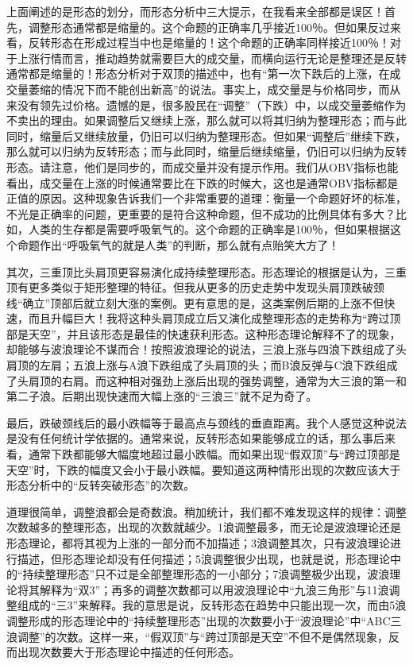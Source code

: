 上面阐述的是形态的划分，而形态分析中三大提示，在我看来全部都是误区！首先，调整形态通常都是缩量的。这个命题的正确率几乎接近100％。但如果反过来看，反转形态在形成过程当中也是缩量的！这个命题的正确率同样接近100％！对于上涨行情而言，推动趋势就需要巨大的成交量，而横向运行无论是整理还是反转通常都是缩量的！形态分析对于双顶的描述中，也有“第一次下跌后的上涨，在成交量萎缩的情况下而不能创出新高”的说法。事实上，成交量是与价格同步，而从来没有领先过价格。遗憾的是，很多股民在“调整”（下跌）中，以成交量萎缩作为不卖出的理由。如果调整后又继续上涨，那么就可以将其归纳为整理形态；而与此同时，缩量后又继续放量，仍旧可以归纳为整理形态。但如果“调整后”继续下跌，那么就可以归纳为反转形态；而与此同时，缩量后继续缩量，仍旧可以归纳为反转形态。请注意，他们是同步的，而成交量并没有提示作用。我们从OBV指标也能看出，成交量在上涨的时候通常要比在下跌的时候大，这也是通常OBV指标都是正值的原因。这种现象告诉我们一个非常重要的道理：衡量一个命题好坏的标准，不光是正确率的问题，更重要的是符合这种命题，但不成功的比例具体有多大？比如，人类的生存都是需要呼吸氧气的。这个命题的正确率是100％，但如果根据这个命题作出“呼吸氧气的就是人类”的判断，那么就有点贻笑大方了！

其次，三重顶比头肩顶更容易演化成持续整理形态。形态理论的根据是认为，三重顶有更多类似于矩形整理的特征。但我从更多的历史走势中发现头肩顶跌破颈线“确立”顶部后就立刻大涨的案例。更有意思的是，这类案例后期的上涨不但快速，而且升幅巨大！我将这种头肩顶成立后又演化成整理形态的走势称为“跨过顶部是天空”，并且该形态是最佳的快速获利形态。这种形态理论解释不了的现象，却能够与波浪理论不谋而合！按照波浪理论的说法，三浪上涨与四浪下跌组成了头肩顶的左肩；五浪上涨与A浪下跌组成了头肩顶的头；而B浪反弹与C浪下跌组成了头肩顶的右肩。而这种相对强劲上涨后出现的强势调整，通常为大三浪的第一和第二子浪。后期出现快速而大幅上涨的“三浪三”就不足为奇了。

最后，跌破颈线后的最小跌幅等于最高点与颈线的垂直距离。我个人感觉这种说法是没有任何统计学依据的。通常来说，反转形态如果能够成立的话，那么事后来看，通常下跌都能够大幅度地超过最小跌幅。而如果出现“假双顶”与“跨过顶部是天空”时，下跌的幅度又会小于最小跌幅。要知道这两种情形出现的次数应该大于形态分析中的“反转突破形态”的次数。

道理很简单，调整浪都会是奇数浪。稍加统计，我们都不难发现这样的规律：调整次数越多的整理形态，出现的次数就越少。1浪调整最多，而无论是波浪理论还是形态理论，都将其视为上涨的一部分而不加描述；3浪调整其次，只有波浪理论进行描述，但形态理论却没有任何描述；5浪调整很少出现，也就是说，形态理论中的“持续整理形态”只不过是全部整理形态的一小部分；7浪调整极少出现，波浪理论将其解释为“双3”；再多的调整次数都可以用波浪理论中“九浪三角形”与11浪调整组成的“三3”来解释。我的意思是说，反转形态在趋势中只能出现一次，而由5浪调整形成的形态理论中的“持续整理形态”出现的次数要小于“波浪理论”中“ABC三浪调整”的次数。这样一来，“假双顶”与“跨过顶部是天空”不但不是偶然现象，反而出现次数要大于形态理论中描述的任何形态。

